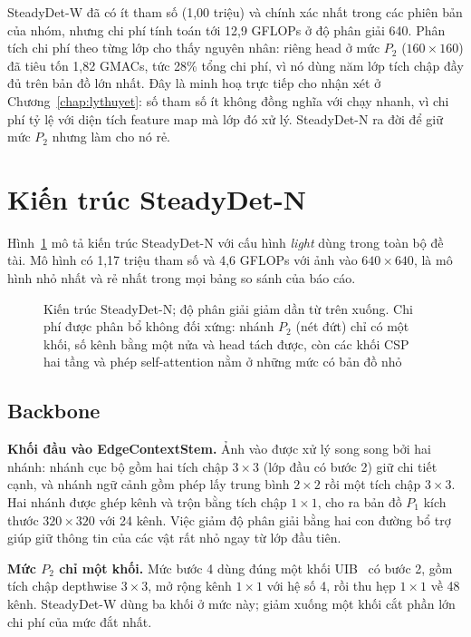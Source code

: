 SteadyDet-W đã có ít tham số (1,00 triệu) và chính xác nhất trong các phiên bản của nhóm, nhưng chi phí tính toán tới 12,9 GFLOPs ở độ phân giải 640. Phân tích chi phí theo từng lớp cho thấy nguyên nhân: riêng head ở mức $P_2$ ($160\times160$) đã tiêu tốn 1,82 GMACs, tức 28\% tổng chi phí, vì nó dùng năm lớp tích chập đầy đủ trên bản đồ lớn nhất. Đây là minh hoạ trực tiếp cho nhận xét ở Chương~\ref{chap:lythuyet}: số tham số ít không đồng nghĩa với chạy nhanh, vì chi phí tỷ lệ với diện tích feature map mà lớp đó xử lý. SteadyDet-N ra đời để giữ mức $P_2$ nhưng làm cho nó rẻ.

\section{Kiến trúc SteadyDet-N}
\label{sec:kientruc}

Hình~\ref{fig:kientruc} mô tả kiến trúc SteadyDet-N với cấu hình \textit{light} dùng trong toàn bộ đề tài. Mô hình có 1,17 triệu tham số và 4,6 GFLOPs với ảnh vào $640\times640$, là mô hình nhỏ nhất và rẻ nhất trong mọi bảng so sánh của báo cáo.

\begin{figure}[H]
\centering
\resizebox{0.97\textwidth}{!}{}
\caption{Kiến trúc SteadyDet-N; độ phân giải giảm dần từ trên xuống. Chi phí được phân bổ không đối xứng: nhánh $P_2$ (nét đứt) chỉ có một khối, số kênh bằng một nửa và head tách được, còn các khối CSP hai tầng và phép self-attention nằm ở những mức có bản đồ nhỏ}
\label{fig:kientruc}
\end{figure}

\subsection{Backbone}

\textbf{Khối đầu vào EdgeContextStem.} Ảnh vào được xử lý song song bởi hai nhánh: nhánh cục bộ gồm hai tích chập $3\times3$ (lớp đầu có bước 2) giữ chi tiết cạnh, và nhánh ngữ cảnh gồm phép lấy trung bình $2\times2$ rồi một tích chập $3\times3$. Hai nhánh được ghép kênh và trộn bằng tích chập $1\times1$, cho ra bản đồ $P_1$ kích thước $320\times320$ với 24 kênh. Việc giảm độ phân giải bằng hai con đường bổ trợ giúp giữ thông tin của các vật rất nhỏ ngay từ lớp đầu tiên.

\textbf{Mức $P_2$ chỉ một khối.} Mức bước 4 dùng đúng một khối UIB~\cite{qin2024mnv4} có bước 2, gồm tích chập depthwise $3\times3$, mở rộng kênh $1\times1$ với hệ số 4, rồi thu hẹp $1\times1$ về 48 kênh. SteadyDet-W dùng ba khối ở mức này; giảm xuống một khối cắt phần lớn chi phí của mức đắt nhất.

